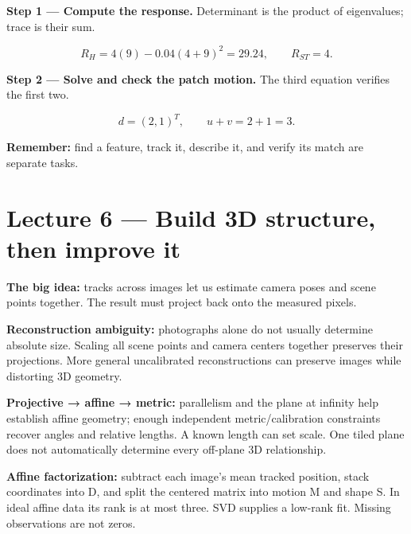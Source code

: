 \documentclass[11pt,letterpaper]{article}
\begin{document}
\textcolor{StepRed}{\textbf{Step 1 — Compute the response.} Determinant is the product of eigenvalues; trace is their sum.}



\begin{tcolorbox}\color{MathBlue}\[R_H=4(9)-0.04(4+9)^2=29.24,\qquad R_{ST}=4.\]\end{tcolorbox}


\textcolor{StepRed}{\textbf{Step 2 — Solve and check the patch motion.} The third equation verifies the first two.}



\begin{tcolorbox}\color{MathBlue}\[d=(2,1)^T,\qquad u+v=2+1=3.\]\end{tcolorbox}


\textbf{Remember:} find a feature, track it, describe it, and verify its match are separate tasks.



\section*{Lecture 6 — Build 3D structure, then improve it}


\textbf{The big idea:} tracks across images let us estimate camera poses and scene points together. The result must project back onto the measured pixels.



\textbf{Reconstruction ambiguity:} photographs alone do not usually determine absolute size. Scaling all scene points and camera centers together preserves their projections. More general uncalibrated reconstructions can preserve images while distorting 3D geometry.



\textbf{Projective → affine → metric:} parallelism and the plane at infinity help establish affine geometry; enough independent metric/calibration constraints recover angles and relative lengths. A known length can set scale. One tiled plane does not automatically determine every off-plane 3D relationship.



\textbf{Affine factorization:} subtract each image's mean tracked position, stack coordinates into D, and split the centered matrix into motion M and shape S. In ideal affine data its rank is at most three. SVD supplies a low-rank fit. Missing observations are not zeros.
\end{document}
